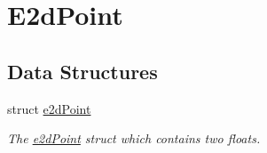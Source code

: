 \hypertarget{group__e2dPoint}{\section{E2d\-Point}
\label{group__e2dPoint}
}
\subsection*{Data Structures}
\begin{DoxyCompactItemize}
\item 
struct \hyperlink{structe2dPoint}{e2d\-Point}
\begin{DoxyCompactList}\small\item\em The \hyperlink{structe2dPoint}{e2d\-Point} struct which contains two floats. \end{DoxyCompactList}\end{DoxyCompactItemize}
